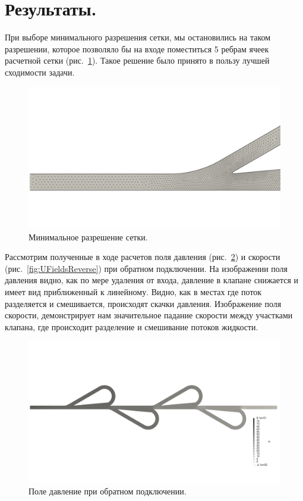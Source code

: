 \documentclass[14pt,a4paper]{article}
\begin{document}
        \section*{Результаты.}
        
        При выборе минимального разрешения сетки, мы остановились на таком разрешении, которое позволяло бы на входе поместиться 5 ребрам ячеек расчетной сетки (рис.~\ref{fig:minMesh}). Такое решение было принято в пользу лучшей сходимости задачи.
        
        \begin{figure}[H]
            \centering
            \includegraphics[width = 1\linewidth]{minMesh}
            \caption{Минимальное разрешение сетки.}
            \label{fig:minMesh}
        \end{figure}
        
        Рассмотрим полученные в ходе расчетов поля давления (рис.~\ref{fig:PFieldsReverse}) и скорости (рис.~\ref{fig:UFieldsReverse}) при обратном подключении. На изображении поля давления видно, как по мере удаления от входа, давление в клапане снижается и имеет вид приближенный к линейному. Видно, как в местах где поток разделяется и смешивается, происходят скачки давления. Изображение поля скорости, демонстрирует нам значительное падание скорости между участками клапана, где происходит разделение и смешивание потоков жидкости.
        
        \begin{figure}[H]
            \centering
            \includegraphics[width = 1\linewidth]{PFieldsReverse}
            \caption{Поле давление при обратном подключении.}
            \label{fig:PFieldsReverse}
        \end{figure}
        
\end{document}
